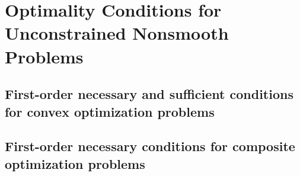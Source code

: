 \chapter{Optimality Conditions for Unconstrained Nonsmooth Problems}

\section{First-order necessary and sufficient conditions for convex optimization problems}

\section{First-order necessary conditions for composite optimization problems}